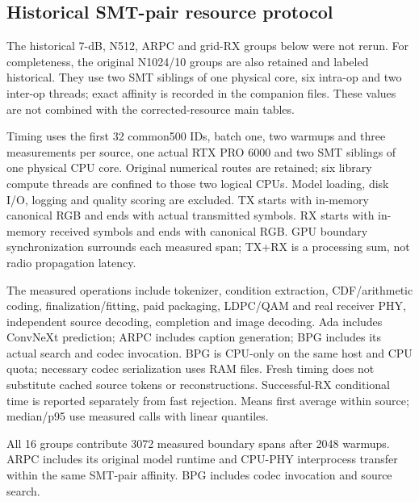 \documentclass[10pt,letterpaper]{article}
\begin{document}
\subsection{Historical SMT-pair resource protocol}\label{sup:timing-historical-protocol}
The historical 7-dB, N512, ARPC and grid-RX groups below were not rerun. For completeness, the original N1024/10 groups are also retained and labeled historical. They use two SMT siblings of one physical core, six intra-op and two inter-op threads; exact affinity is recorded in the companion files. These values are not combined with the corrected-resource main tables.

Timing uses the first 32 common500 IDs, batch one, two warmups and three measurements per source, one actual RTX PRO 6000 and two SMT siblings of one physical CPU core. Original numerical routes are retained; six library compute threads are confined to those two logical CPUs. Model loading, disk I/O, logging and quality scoring are excluded. TX starts with in-memory canonical RGB and ends with actual transmitted symbols. RX starts with in-memory received symbols and ends with canonical RGB. GPU boundary synchronization surrounds each measured span; TX+RX is a processing sum, not radio propagation latency.

The measured operations include tokenizer, condition extraction, CDF/arithmetic coding, finalization/fitting, paid packaging, LDPC/QAM and real receiver PHY, independent source decoding, completion and image decoding. Ada includes ConvNeXt prediction; ARPC includes caption generation; BPG includes its actual search and codec invocation. BPG is CPU-only on the same host and CPU quota; necessary codec serialization uses RAM files. Fresh timing does not substitute cached source tokens or reconstructions. Successful-RX conditional time is reported separately from fast rejection. Means first average within source; median/p95 use measured calls with linear quantiles.

All 16 groups contribute 3072 measured boundary spans after 2048 warmups. ARPC includes its original model runtime and CPU-PHY interprocess transfer within the same SMT-pair affinity. BPG includes codec invocation and source search.
\end{document}
